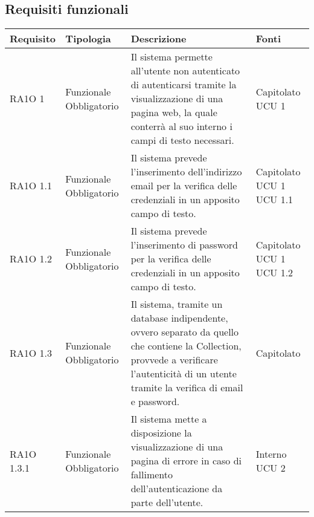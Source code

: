 \subsection{Requisiti funzionali }

      \begin{center}
      \bgroup
      \def\arraystretch{1.8}
      \begin{longtable}{ | l | p{2cm} | p{5cm} | p{1.7cm} |}
    
      \cellcolor[gray]{0.9} \textbf{Requisito} & \cellcolor[gray]{0.9} \textbf{Tipologia} 
      & \cellcolor[gray]{0.9} \textbf{Descrizione} & \cellcolor[gray]{0.9} \textbf{Fonti} \\ \hline
      
        RA1O 1 & Funzionale \newline  Obbligatorio  & Il sistema permette all'utente non autenticato di autenticarsi tramite la visualizzazione di una pagina web, la quale conterrà al suo interno i campi di testo necessari. &  Capitolato \newline  UCU 1 \newline  \\ \hline      
        RA1O 1.1 & Funzionale \newline  Obbligatorio  & Il sistema prevede l'inserimento dell'indirizzo email per la verifica delle credenziali in un apposito campo di testo. &  Capitolato \newline  UCU 1 \newline  UCU 1.1 \newline  \\ \hline      
        RA1O 1.2 & Funzionale \newline  Obbligatorio  & Il sistema prevede l'inserimento di password per la verifica delle credenziali in un apposito campo di testo. &  Capitolato \newline  UCU 1 \newline  UCU 1.2 \newline  \\ \hline      
        RA1O 1.3 & Funzionale \newline  Obbligatorio  & Il sistema, tramite un database indipendente, ovvero separato da quello che contiene la Collection, provvede a verificare l'autenticità  di un utente tramite la verifica di email e password. &  Capitolato \newline  \\ \hline      
        RA1O 1.3.1 & Funzionale \newline  Obbligatorio  & Il sistema mette a disposizione la visualizzazione di una pagina di errore in caso di fallimento dell'autenticazione da parte dell'utente. &  Interno \newline  UCU 2 \newline  \\ \hline      

\end{longtable}
\end{center}

